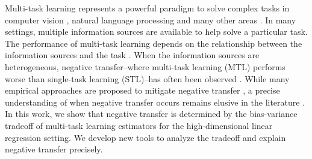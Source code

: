 Multi-task learning represents a powerful paradigm to solve complex tasks in computer vision \cite{chexnet17,ZSSGM18}, natural language processing \cite{GLUE,superglue} and many other areas \cite{ZY17}.
In many settings, multiple information sources are available to help solve a particular task.
The performance of multi-task learning depends on the relationship between the information sources and the task \cite{C97}.
When the information sources are heterogeneous, negative transfer--where multi-task learning (MTL)  performs worse than single-task learning (STL)--has often been observed \cite{PY09,AP16,BS17}.
While many empirical approaches are proposed to mitigate negative transfer \cite{ZY17}, a precise understanding of when negative transfer occurs remains elusive in the literature \cite{R17}.
In this work, we show that negative transfer is determined by the bias-variance tradeoff of multi-task learning estimators for the high-dimensional linear regression setting. %
We develop new tools to analyze the tradeoff and explain negative transfer precisely.

